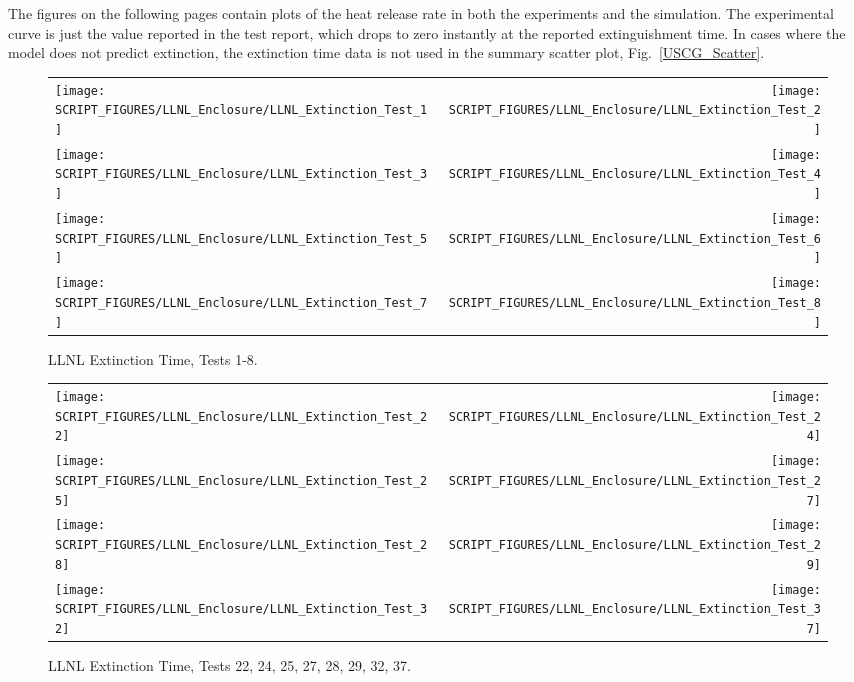 The figures on the following pages contain plots of the heat release rate in both the experiments and the simulation. The experimental curve is just the value reported in the test report, which drops to zero instantly at the reported extinguishment time. In cases where the model does not predict extinction, the extinction time data is not used in the summary scatter plot, Fig.~\ref{USCG_Scatter}.

\newpage

\begin{figure}[p]
\begin{tabular*}{\textwidth}{l@{\extracolsep{\fill}}r}
\texttt{[image: SCRIPT\_FIGURES/LLNL\_Enclosure/LLNL\_Extinction\_Test\_1]} &
\texttt{[image: SCRIPT\_FIGURES/LLNL\_Enclosure/LLNL\_Extinction\_Test\_2]} \\
\texttt{[image: SCRIPT\_FIGURES/LLNL\_Enclosure/LLNL\_Extinction\_Test\_3]} &
\texttt{[image: SCRIPT\_FIGURES/LLNL\_Enclosure/LLNL\_Extinction\_Test\_4]} \\
\texttt{[image: SCRIPT\_FIGURES/LLNL\_Enclosure/LLNL\_Extinction\_Test\_5]} &
\texttt{[image: SCRIPT\_FIGURES/LLNL\_Enclosure/LLNL\_Extinction\_Test\_6]} \\
\texttt{[image: SCRIPT\_FIGURES/LLNL\_Enclosure/LLNL\_Extinction\_Test\_7]} &
\texttt{[image: SCRIPT\_FIGURES/LLNL\_Enclosure/LLNL\_Extinction\_Test\_8]}
\end{tabular*}
\caption[LLNL Extinction Time, Tests 1-8]{LLNL Extinction Time, Tests 1-8.}
\label{LLNL_Extinction_1}
\end{figure}

\begin{figure}[p]
\begin{tabular*}{\textwidth}{l@{\extracolsep{\fill}}r}
\texttt{[image: SCRIPT\_FIGURES/LLNL\_Enclosure/LLNL\_Extinction\_Test\_22]} &
\texttt{[image: SCRIPT\_FIGURES/LLNL\_Enclosure/LLNL\_Extinction\_Test\_24]} \\
\texttt{[image: SCRIPT\_FIGURES/LLNL\_Enclosure/LLNL\_Extinction\_Test\_25]} &
\texttt{[image: SCRIPT\_FIGURES/LLNL\_Enclosure/LLNL\_Extinction\_Test\_27]} \\
\texttt{[image: SCRIPT\_FIGURES/LLNL\_Enclosure/LLNL\_Extinction\_Test\_28]} &
\texttt{[image: SCRIPT\_FIGURES/LLNL\_Enclosure/LLNL\_Extinction\_Test\_29]} \\
\texttt{[image: SCRIPT\_FIGURES/LLNL\_Enclosure/LLNL\_Extinction\_Test\_32]} &
\texttt{[image: SCRIPT\_FIGURES/LLNL\_Enclosure/LLNL\_Extinction\_Test\_37]}
\end{tabular*}
\caption[LLNL Extinction Time, Tests 22, 24, 25, 27, 28, 29, 32, 37]
{LLNL Extinction Time, Tests 22, 24, 25, 27, 28, 29, 32, 37.}
\label{LLNL_Extinction_2}
\end{figure}


